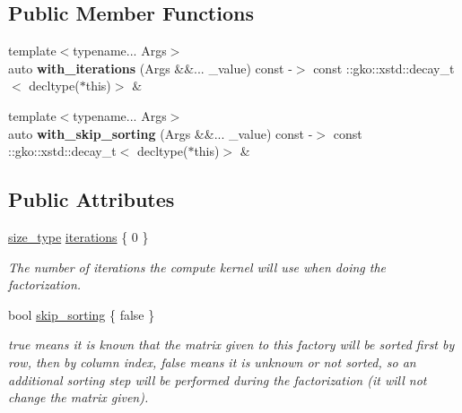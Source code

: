 \subsection*{Public Member Functions}
\begin{DoxyCompactItemize}
\item 
\mbox{\label{structgko_1_1factorization_1_1ParIlu_1_1parameters__type_ae2d31c4997de91fcee9910c3466dd42b}} 
{\footnotesize template$<$typename... Args$>$ }\\auto {\bfseries with\+\_\+iterations} (Args \&\&... \+\_\+value) const -\/$>$ const \+::gko\+::xstd\+::decay\+\_\+t$<$ decltype($\ast$this)$>$ \&
\item 
\mbox{\label{structgko_1_1factorization_1_1ParIlu_1_1parameters__type_ac4d30b8ad0bce259958e418600151e3d}} 
{\footnotesize template$<$typename... Args$>$ }\\auto {\bfseries with\+\_\+skip\+\_\+sorting} (Args \&\&... \+\_\+value) const -\/$>$ const \+::gko\+::xstd\+::decay\+\_\+t$<$ decltype($\ast$this)$>$ \&
\end{DoxyCompactItemize}
\subsection*{Public Attributes}
\begin{DoxyCompactItemize}
\item 
\hyperlink{namespacegko_a6e5c95df0ae4e47aab2f604a22d98ee7}{size\+\_\+type} \hyperlink{structgko_1_1factorization_1_1ParIlu_1_1parameters__type_acf87db3479a61d53d301101b51e419c6}{iterations} \{ 0 \}
\begin{DoxyCompactList}\small\item\em The number of iterations the {\ttfamily compute} kernel will use when doing the factorization. \end{DoxyCompactList}\item 
bool \hyperlink{structgko_1_1factorization_1_1ParIlu_1_1parameters__type_a89a795e164b7bbe60dbccf0484c1d411}{skip\+\_\+sorting} \{ false \}
\begin{DoxyCompactList}\small\item\em {\ttfamily true} means it is known that the matrix given to this factory will be sorted first by row, then by column index, {\ttfamily false} means it is unknown or not sorted, so an additional sorting step will be performed during the factorization (it will not change the matrix given). \end{DoxyCompactList}\end{DoxyCompactItemize}
